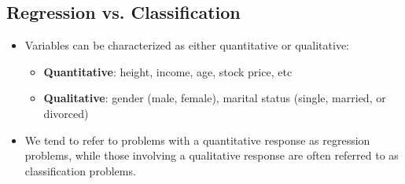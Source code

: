 \documentclass[11pt]{article}
\begin{document}
\subsection{Regression vs. Classification}
\begin{itemize}
  \item Variables can be characterized as either quantitative or qualitative:
  \begin{itemize}
    \item \textbf{Quantitative}: height, income, age, stock price, etc
    \item \textbf{Qualitative}: gender (male, female), marital status (single, married, or divorced)
  \end{itemize}
  \item We tend to refer to problems with a quantitative response as regression problems, while those involving a qualitative response are often referred to as classification problems.
\end{itemize}
\end{document}
